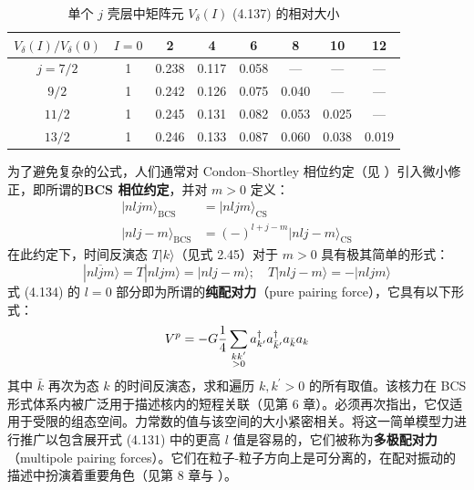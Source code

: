 \begin{table}[H]
\begin{centering}
\caption{\label{tab:Vdelta=0076F8=005BF9=005927=005C0F}单个 $j$ 壳层中矩阵元 $V_{\delta}(I)$
(4.137) 的相对大小}
\par\end{centering}
\centering{}%
\begin{tabular}{cccccccc}
\hline 
$V_{\delta}(I)/V_{\delta}(0)$ & $I=0$ & 2 & 4 & 6 & 8 & 10 & 12\tabularnewline
\hline 
$j=7/2$ & 1 & 0.238 & 0.117 & 0.058 & — & — & —\tabularnewline
$9/2$ & 1 & 0.242 & 0.126 & 0.075 & 0.040 & — & —\tabularnewline
$11/2$ & 1 & 0.245 & 0.131 & 0.082 & 0.053 & 0.025 & —\tabularnewline
$13/2$ & 1 & 0.246 & 0.133 & 0.087 & 0.060 & 0.038 & 0.019\tabularnewline
\hline 
\end{tabular}
\end{table}

为了避免复杂的公式，人们通常对 Condon–Shortley 相位约定（见 \cite{Ed57}）引入微小修正，即所谓的\textbf{BCS
相位约定}，并对 $m>0$ 定义：
\begin{align}
|nljm\rangle_{\text{BCS}} & =|nljm\rangle_{\text{CS}}\nonumber \\
|nlj-m\rangle_{\text{BCS}} & =(-)^{l+j-m}|nlj-m\rangle_{\text{CS}}\label{eq:BCS phases}
\end{align}
在此约定下，时间反演态 $T|k\rangle$（见式 2.45）对于 $m>0$ 具有极其简单的形式：
\begin{equation}
|\overline{nljm}\rangle=T|nljm\rangle=|nlj-m\rangle;\quad T|nlj-m\rangle=-|nljm\rangle\label{eq:4.139}
\end{equation}
式 (4.134) 的 $l=0$ 部分即为所谓的\textbf{纯配对力}（pure pairing force），它具有以下形式：
\begin{equation}
V^{p}=-G\frac{1}{4}\sum_{\begin{subarray}{c}
kk^{\prime}\\
>0
\end{subarray}}a^{\dagger}_{k^{\prime}}a^{\dagger}_{\bar{k}^{\prime}}a_{\bar{k}}a_{k}\label{eq:pure pairing force}
\end{equation}
其中 $\bar{k}$ 再次为态 $k$ 的时间反演态，求和遍历 $k,k^{\prime}>0$ 的所有取值。该核力在 BCS
形式体系内被广泛用于描述核内的短程关联（见第 6 章）。必须再次指出，它仅适用于受限的组态空间。力常数的值与该空间的大小紧密相关。将这一简单模型力进行推广以包含展开式
(4.131) 中的更高 $l$ 值是容易的，它们被称为\textbf{多极配对力}（multipole pairing forces）。它们在粒子-粒子方向上是可分离的，在配对振动的描述中扮演着重要角色（见第
8 章与 \cite{BB71,BBN74b}）。

